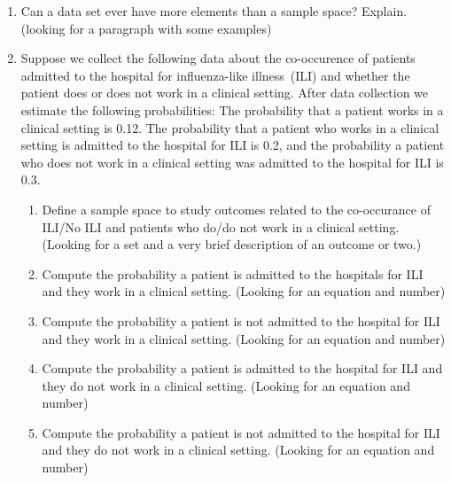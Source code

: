\begin{enumerate}
   \item Can a data set ever have more elements than a sample space? Explain. (looking for a paragraph with some examples)
   
   \item Suppose we collect the following data about the co-occurence of patients admitted to the hospital for influenza-like illness~(ILI) and whether the patient does or does not work in a clinical setting. 
   After data collection we estimate the following probabilities: The probability that a patient works in a clinical setting is 0.12. The probability that a patient who works in a clinical setting is admitted to the hospital for ILI is 0.2, and the probability a patient who does not work in a clinical setting was admitted to the hospital for ILI is 0.3. 
   \begin{enumerate}
       \item Define a sample space to study outcomes related to the co-occurance of ILI/No ILI and patients who do/do not work in a clinical setting. (Looking for a set and a very brief description of an outcome or two.) 
       \item Compute the probability a patient is admitted to the hospitals for ILI and they work in a clinical setting. (Looking for an equation and number)
       \item Compute the probability a patient is not admitted to the hospital for ILI and they work in a clinical setting. (Looking for an equation and number)
       \item Compute the probability a patient is admitted to the hospital for ILI and they do not work in a clinical setting. (Looking for an equation and number)
       \item Compute the probability a patient is not admitted to the hospital for ILI and they do not work in a clinical setting. (Looking for an equation and number)
   \end{enumerate}
   

\end{enumerate}
